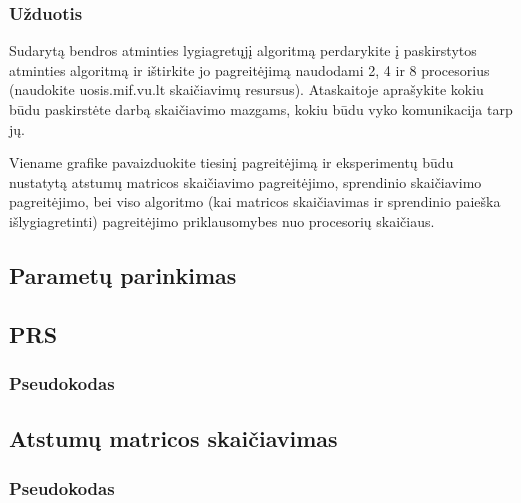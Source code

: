 \documentclass[a4paper,10pt]{article}
\begin{document}
\subsubsection{Užduotis}
Sudarytą bendros atminties lygiagretųjį algoritmą perdarykite į paskirstytos atminties algoritmą ir ištirkite jo pagreitėjimą naudodami 2, 4 ir 8 procesorius (naudokite uosis.mif.vu.lt skaičiavimų resursus). Ataskaitoje aprašykite kokiu būdu paskirstėte darbą skaičiavimo mazgams, kokiu būdu vyko komunikacija tarp jų.

Viename grafike pavaizduokite tiesinį pagreitėjimą ir eksperimentų būdu nustatytą atstumų matricos skaičiavimo pagreitėjimo, sprendinio skaičiavimo pagreitėjimo, bei viso algoritmo (kai matricos skaičiavimas ir sprendinio paieška išlygiagretinti) pagreitėjimo priklausomybes nuo procesorių skaičiaus.
\newpage
\subsection{Parametų parinkimas}
\subsection{PRS}
\subsubsection{Pseudokodas}
\subsection{Atstumų matricos skaičiavimas}
\subsubsection{Pseudokodas}
\end{document}
